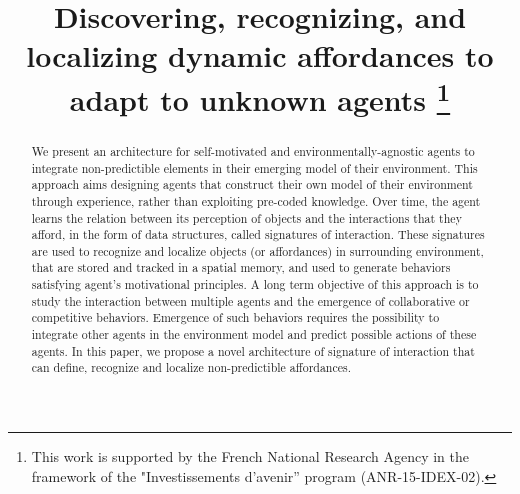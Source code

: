 \documentclass[conference]{IEEEtran}
\begin{document}
\title{%
Discovering, recognizing, and localizing dynamic affordances to adapt to unknown agents
\thanks{This work is supported by the French National Research Agency in the framework of the "Investissements d’avenir” program (ANR-15-IDEX-02).}
}

\author{
\and
{}
\and
{}
}

\maketitle

\begin{abstract}
We present an architecture for self-motivated and environmentally-agnostic agents to integrate non-predictible elements in their emerging model of their environment. This approach aims designing agents that construct their own model of their environment through experience, rather than exploiting pre-coded knowledge. Over time, the agent learns the relation between its perception of objects and the interactions that they afford, in the form of data structures, called signatures of interaction. These signatures are used to recognize and localize objects (or affordances) in surrounding environment, that are stored and tracked in a spatial memory, and used to generate behaviors satisfying agent's motivational principles. A long term objective of this approach is to study the interaction between multiple agents and the emergence of collaborative or competitive behaviors. Emergence of such behaviors requires the possibility to integrate other agents in the environment model and predict possible actions of these agents. In this paper, we propose a novel architecture of signature of interaction that can define, recognize and localize non-predictible affordances.%
\end{abstract}
\end{document}
